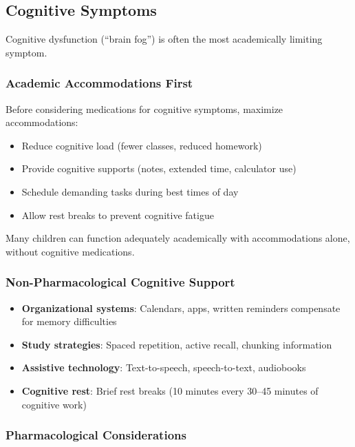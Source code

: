\subsection{Cognitive Symptoms}
\label{subsec:ped-ambulatory-cognitive}

Cognitive dysfunction (``brain fog'') is often the most academically limiting symptom.

\subsubsection{Academic Accommodations First}

Before considering medications for cognitive symptoms, maximize accommodations:

\begin{itemize}
    \item Reduce cognitive load (fewer classes, reduced homework)
    \item Provide cognitive supports (notes, extended time, calculator use)
    \item Schedule demanding tasks during best times of day
    \item Allow rest breaks to prevent cognitive fatigue
\end{itemize}

Many children can function adequately academically with accommodations alone, without cognitive medications.

\subsubsection{Non-Pharmacological Cognitive Support}

\begin{itemize}
    \item \textbf{Organizational systems}: Calendars, apps, written reminders compensate for memory difficulties
    \item \textbf{Study strategies}: Spaced repetition, active recall, chunking information
    \item \textbf{Assistive technology}: Text-to-speech, speech-to-text, audiobooks
    \item \textbf{Cognitive rest}: Brief rest breaks (10 minutes every 30--45 minutes of cognitive work)
\end{itemize}

\subsubsection{Pharmacological Considerations}

